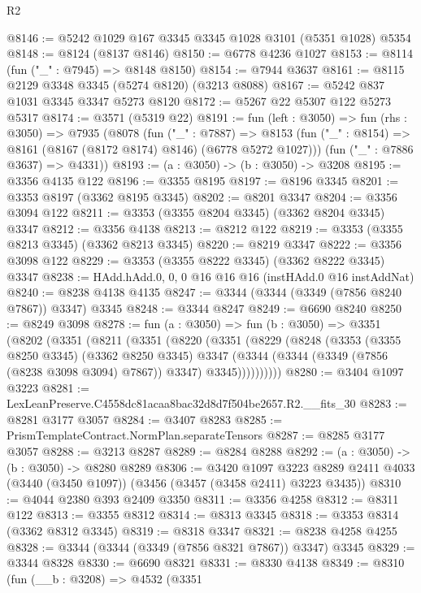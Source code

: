 \begin{lexlean}{R2}
\begin{coremodule}
@8146 := @5242 @1029 @167 @3345 @3345 @1028 @3101 (@5351 @1028) @5354
@8148 := @8124 (@8137 @8146)
@8150 := @6778 @4236 @1027
@8153 := @8114 (fun ("_" : @7945) => @8148 @8150)
@8154 := @7944 @3637
@8161 := @8115 @2129 @3348 @3345 (@5274 @8120) (@3213 @8088)
@8167 := @5242 @837 @1031 @3345 @3347 @5273 @8120
@8172 := @5267 @22 @5307 @122 @5273 @5317
@8174 := @3571 (@5319 @22)
@8191 := fun (left : @3050) =>
  fun (rhs : @3050) =>
  @7935
    (@8078
      (fun ("_" : @7887) =>
      @8153 (fun ("_" : @8154) => @8161 (@8167 (@8172 @8174) @8146) (@6778 @5272 @1027)))
      (fun ("_" : @7886 @3637) => @4331))
@8193 := (a : @3050) -> (b : @3050) -> @3208
@8195 := @3356 @4135 @122
@8196 := @3355 @8195
@8197 := @8196 @3345
@8201 := @3353 @8197 (@3362 @8195 @3345)
@8202 := @8201 @3347
@8204 := @3356 @3094 @122
@8211 := @3353 (@3355 @8204 @3345) (@3362 @8204 @3345) @3347
@8212 := @3356 @4138
@8213 := @8212 @122
@8219 := @3353 (@3355 @8213 @3345) (@3362 @8213 @3345)
@8220 := @8219 @3347
@8222 := @3356 @3098 @122
@8229 := @3353 (@3355 @8222 @3345) (@3362 @8222 @3345) @3347
@8238 := HAdd.hAdd.{0, 0, 0} @16 @16 @16 (instHAdd.{0} @16 instAddNat)
@8240 := @8238 @4138 @4135
@8247 := @3344 (@3344 (@3349 (@7856 @8240 @7867)) @3347) @3345
@8248 := @3344 @8247
@8249 := @6690 @8240
@8250 := @8249 @3098
@8278 := fun (a : @3050) =>
  fun (b : @3050) =>
  @3351
    (@8202
      (@3351
        (@8211
          (@3351
            (@8220
              (@3351
                (@8229
                  (@8248
                    (@3353
                      (@3355 @8250 @3345)
                      (@3362 @8250 @3345)
                      @3347
                      (@3344 (@3344 (@3349 (@7856 (@8238 @3098 @3094) @7867)) @3347) @3345))))))))))
@8280 := @3404 @1097 @3223
@8281 := LexLeanPreserve.C4558dc81acaa8bac32d8d7f504be2657.R2.__fits_30
@8283 := @8281 @3177 @3057
@8284 := @3407 @8283
@8285 := PrismTemplateContract.NormPlan.separateTensors
@8287 := @8285 @3177 @3057
@8288 := @3213 @8287
@8289 := @8284 @8288
@8292 := (a : @3050) -> (b : @3050) -> @8280 @8289
@8306 := @3420
    @1097
    @3223
    @8289
    @2411
    @4033
    (@3440 (@3450 @1097))
    (@3456 (@3457 (@3458 @2411) @3223 @3435))
@8310 := @4044 @2380 @393 @2409 @3350
@8311 := @3356 @4258
@8312 := @8311 @122
@8313 := @3355 @8312
@8314 := @8313 @3345
@8318 := @3353 @8314 (@3362 @8312 @3345)
@8319 := @8318 @3347
@8321 := @8238 @4258 @4255
@8328 := @3344 (@3344 (@3349 (@7856 @8321 @7867)) @3347) @3345
@8329 := @3344 @8328
@8330 := @6690 @8321
@8331 := @8330 @4138
@8349 := @8310
    (fun (__b : @3208) =>
    @4532
      (@3351

\end{coremodule}
\end{lexlean}
